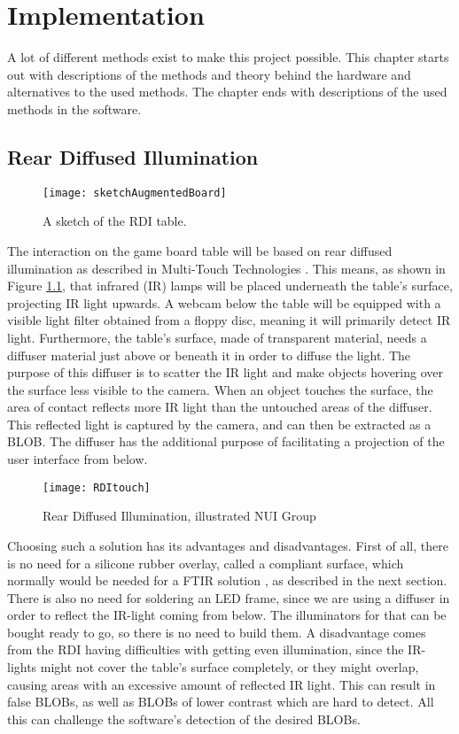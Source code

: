 
\chapter{Implementation}\label{ch:implementation}
A lot of different methods exist to make this project possible. This chapter starts out with descriptions of the methods and theory behind the hardware and alternatives to the used methods. The chapter ends with descriptions of the used methods in the software. 


\section{Rear Diffused Illumination} \label{sec:RDI}
\begin{figure}[!h]
\centering	\texttt{[image: sketchAugmentedBoard]}
 \caption{A sketch of the RDI table.\label{Fig:sketch}}
\end{figure}
The interaction on the game board table will be based on rear diffused illumination as described in Multi-Touch Technologies \citep{multiTT}. This means, as shown in Figure \ref{Fig:sketch}, that infrared (IR) lamps will be placed underneath the table's surface, projecting IR light upwards. A webcam below the table will be equipped with a visible light filter obtained from a floppy disc, meaning it will primarily detect IR light. Furthermore, the table's surface, made of transparent material, needs a diffuser material just above or beneath it in order to diffuse the light. The purpose of this diffuser is to scatter the IR light and make objects hovering over the surface less visible to the camera. When an object touches the surface, the area of contact reflects more IR light than the untouched areas of the diffuser. This reflected light is captured by the camera, and can then be extracted as a BLOB. The diffuser has the additional purpose of facilitating a projection of the user interface from below.

\begin{figure}[!h]
\centering	\texttt{[image: RDItouch]}
 \caption{Rear Diffused Illumination, illustrated NUI Group \citep{multiTT}\label{Fig:RDI}}
\end{figure}

Choosing such a solution has its advantages and disadvantages. First of all, there is no need for a silicone rubber overlay, called a compliant surface, which normally would be needed for a FTIR solution \citep{multiTT}, as described in the next section. There is also no need for soldering an LED frame, since we are using a diffuser in order to reflect the IR-light coming from below. The illuminators for that can be bought ready to go, so there is no need to build them. A disadvantage comes from the RDI having difficulties with getting even illumination, since the IR-lights might not cover the table's surface completely, or they might overlap, causing areas with an excessive amount of reflected IR light. This can result in false BLOBs, as well as BLOBs of lower contrast which are hard to detect. All this can challenge the software's detection of the desired BLOBs.

